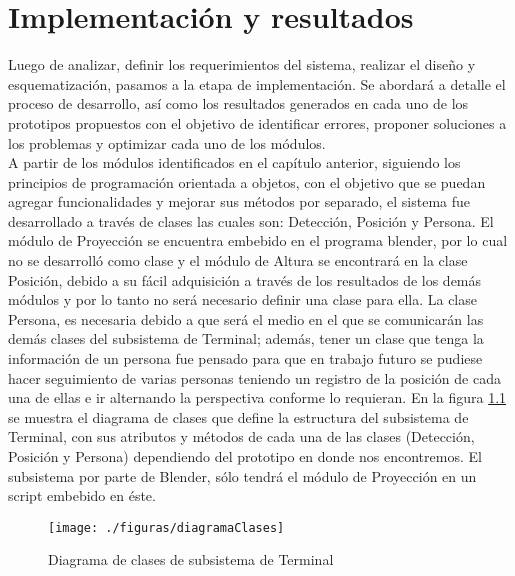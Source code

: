 \documentclass[a4paper,openright,12pt]{report}
\begin{document}
\chapter{Implementación y resultados}\label{cap.implementacionyresultados}
Luego de analizar, definir los requerimientos del sistema, realizar el diseño y esquematización, pasamos a la etapa de implementación. Se abordará a detalle el proceso de desarrollo, así como los resultados generados en cada uno de los prototipos propuestos con el objetivo de identificar errores, proponer soluciones a los problemas y optimizar cada uno de los módulos.\\
A partir de los módulos identificados en el capítulo anterior, siguiendo los principios de programación orientada a objetos, con el objetivo que se puedan agregar funcionalidades y mejorar sus métodos por separado, el sistema fue desarrollado a través de clases las cuales son: Detección, Posición y Persona. El módulo de Proyección se encuentra embebido en el programa blender, por lo cual no se desarrolló como clase y el módulo de Altura se encontrará en la clase Posición, debido a su fácil adquisición a través de los resultados de los demás módulos y por lo tanto no será necesario definir una clase para ella. La clase Persona, es necesaria debido a que será el medio en el que se comunicarán las demás clases del subsistema de Terminal; además, tener un clase que tenga la información de un persona fue pensado para que en trabajo futuro se pudiese hacer seguimiento de varias personas teniendo un registro de la posición de cada una de ellas e ir alternando la perspectiva conforme lo requieran. En la figura \ref{fig:diagramaClases} se muestra el diagrama de clases que define la estructura del subsistema de Terminal, con sus atributos y métodos de cada una de las clases (Detección, Posición y Persona) dependiendo del prototipo en donde nos encontremos. El subsistema por parte de Blender, sólo tendrá el módulo de Proyección en un script embebido en éste.\\

\begin{figure}[th]
	\centering
	\texttt{[image: ./figuras/diagramaClases]}
	\caption{Diagrama de clases de subsistema de Terminal} \label{fig:diagramaClases}
\end{figure}
\end{document}
